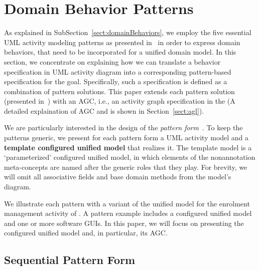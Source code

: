 \section{Domain Behavior Patterns}
\label{sect:behaviorPatterns}

As explained in SubSection~\ref{sect:domainBehaviors}, we employ the five essential UML activity modeling patterns as presented in~\cite{le_domain_2018} in order to express domain behaviors, that need to be incorporated for a unified domain model. In this section, we concentrate on explaining how we can translate a behavior specification in UML activity diagram into a corresponding pattern-based specification for the goal. Specifically, such a specification is defined as a combination of pattern solutions. This paper extends each pattern solution (presented in~\cite{le_domain_2018}) with an AGC, i.e., an activity graph specification in the \agl (A detailed explaination of AGC and \agl is shown in Section~\ref{sect:agl}).

We are particularly interested in the design of the \textit{pattern form}~\cite{riehle_understanding_1996, gamma_design_1994}. To keep the patterns generic, we present for each pattern form a UML activity model and a \textbf{template configured unified model} that realizes it. The template model is a `parameterized' configured unified model, in which elements of the nonannotation meta-concepts are named after the generic roles that they play. 
%
For brevity, we will omit all associative fields and base domain methods from the model's diagram.

We illustrate each pattern with a variant of the unified model for the enrolment management activity of \courseman. A pattern example includes a configured unified model and one or more software GUIs. In this paper, we will focus on presenting the configured unified model and, in particular, its AGC. 


\subsection{Sequential Pattern Form} \label{sect:sequential-pattern}

